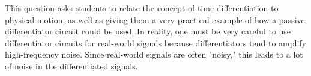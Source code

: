 





This question asks students to relate the concept of time-differentiation to physical motion, as well as giving them a very practical example of how a passive differentiator circuit could be used.  In reality, one must be very careful to use differentiator circuits for real-world signals because differentiators tend to amplify high-frequency noise.  Since real-world signals are often "noisy," this leads to a lot of noise in the differentiated signals.




